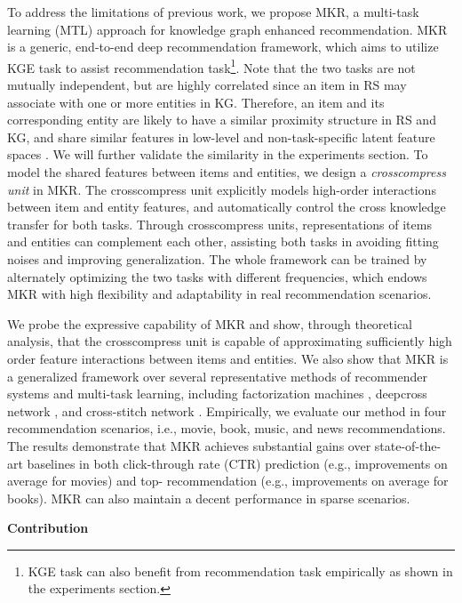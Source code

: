 \documentclass[sigconf]{acmart}
\begin{document}
	To address the limitations of previous work, we propose MKR, a multi-task learning (MTL) approach for knowledge graph enhanced recommendation.
	MKR is a generic, end-to-end deep recommendation framework, which aims to utilize KGE task to assist recommendation task\footnote{KGE task can also benefit from recommendation task empirically as shown in the experiments section.}.
	Note that the two tasks are not mutually independent, but are highly correlated since an item in RS may associate with one or more entities in KG.
	Therefore, an item and its corresponding entity are likely to have a similar proximity structure in RS and KG, and share similar features in low-level and non-task-specific latent feature spaces \cite{long2017learning}.
	We will further validate the similarity in the experiments section.
	To model the shared features between items and entities, we design a \textit{crosscompress unit} in MKR.
	The crosscompress unit explicitly models high-order interactions between item and entity features, and automatically control the cross knowledge transfer for both tasks.
	Through crosscompress units, representations of items and entities can complement each other, assisting both tasks in avoiding fitting noises and improving generalization.
	The whole framework can be trained by alternately optimizing the two tasks with different
frequencies, which endows MKR with high flexibility and adaptability in real recommendation scenarios.
	
	We probe the expressive capability of MKR and show, through theoretical analysis, that the crosscompress unit is capable of approximating sufficiently high order feature interactions between items and entities.
	We also show that MKR is a generalized framework over several representative methods of recommender systems and multi-task learning, including factorization machines \cite{rendle2010factorization, rendle2012factorization}, deepcross network \cite{wang2017deep}, and cross-stitch network \cite{misra2016cross}.
	Empirically, we evaluate our method in four recommendation scenarios, i.e., movie, book, music, and news recommendations.
	The results demonstrate that MKR achieves substantial gains over state-of-the-art baselines in both click-through rate (CTR) prediction (e.g.,   improvements on average for movies) and top- recommendation (e.g.,   improvements on average for books).
	MKR can also maintain a decent performance in sparse scenarios.
	
	\vspace{0.5em}
	\noindent\textbf{Contribution}		
	
\end{document}
